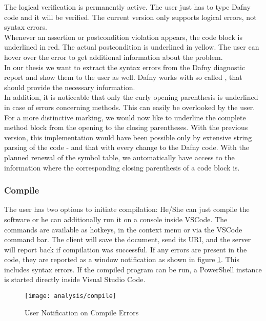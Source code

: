 The logical verification is permanently active.
The user just has to type Dafny code and it will be verified.
The current version only supports logical errors, not syntax errors.\\

Whenever an assertion or postcondition violation appears, the code block is underlined in red.
The actual postcondition is underlined in yellow.
The user can hover over the error to get additional information about the problem. \\

In our thesis we want to extract the syntax errors from the Dafny diagnostic report and show them to the user as well.
Dafny works with so called , that should provide the necessary information.\\

In addition, it is noticeable that only the curly opening parenthesis is underlined in case of errors concerning methods.
This can easily be overlooked by the user.
For a more distinctive marking, we would now like to underline the complete method block from the opening to the closing parentheses.
With the previous version, this implementation would have been possible only by extensive string parsing of the code - and that with every change to the Dafny code.
With the planned renewal of the symbol table, we automatically have access to the information where the corresponding closing parenthesis of a code block is.

\subsubsection{Compile}
The user has two options to initiate compilation: He/She can just compile the software or he can additionally run it on a console inside VSCode.
The commands are available as hotkeys, in the context menu or via the VSCode command bar.
The client will save the document, send its URI, and the server will report back if compilation was successful.
If any errors are present in the code, they are reported as a window notification as shown in figure \ref{fig:analysis_compile}.
This includes syntax errors. If the compiled program can be run, a PowerShell instance is started directly inside Visual Studio Code. 

\begin{figure}[H]
    \centering
    \texttt{[image: analysis/compile]}
    \caption{User Notification on Compile Errors}
    \label{fig:analysis_compile}
\end{figure}

